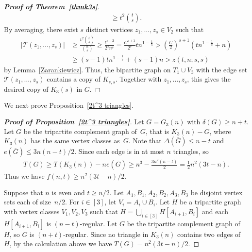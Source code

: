 \documentclass[11pt]{article}
\numberwithin{equation}{section}
\begin{document}
\begin{proof}[\textbf{Proof of Theorem~\ref{thmk3s}}]
\begin{align*}
			\geq t^2\binom{t}{s}.
		\end{align*}
		By averaging, there exist $s$ distinct vertices $z_1,\dots,z_s\in V_2$ such that
		\begin{align*}
			|\mathcal{T}(z_1,\dots,z_s)|&\geq \frac{t^2\binom{t}{s}}{\binom{n}{s}}
			\geq \frac{t^{s+2}}{2^sn^s}
			= \frac{C^{s+1}}{2^s} t n^{1-\frac{1}{s}} > \left(\frac{C}{2} \right)^{s+1} \left( t n^{1-\frac{1}{s}} + n \right)\\
			&\ge (s-1)t n^{1-\frac{1}{s}} + (s-1) n >  z(t, n; s, s)
					\end{align*}
			by Lemma~\ref{Zarankiewicz}.
		Thus, the bipartite graph on $T_1\cup V_3$ with the edge set $\mathcal{T}(z_1,\dots,z_s)$ contains a copy of $K_{s, s}$. Together with $z_1,\dots,z_s$, this gives the desired copy of  $K_3(s)$ in $G$.		
	\end{proof}
	
	
We next prove Proposition~\ref{2t^3 triangles}.	
	
	\begin{proof}[\textbf{Proof of Proposition~\ref{2t^3 triangles}}]
		Let $G = G_3(n)$ with $\delta(G) \ge n+t$. 
		Let $\overline{G}$ be the tripartite complement graph of~$G$, that is $K_3(n) - G$, where $K_3(n)$ has the same vertex classes as~$G$. 
		Note that $\Delta(\overline{G}) \le n-t$ and $e(\overline{G}) \le 3n(n-t)/2$. 
		Since each edge is in at most $n$ triangles, so 
		\begin{align*}
			T(G) \ge T(K_3(n)) - n e(\overline{G}) 
			\geq n^3 - \frac{3n^2(n-t)}2
			= \frac12 n^2 (3t-n).
		\end{align*}
		Thus we have $f(n,t) \ge n^2 (3t-n)/2$.
		
		
		Suppose that $n$ is even and $t \ge n/2$. 
		Let $A_1, B_1, A_2, B_2, A_3,B_3$ be disjoint vertex sets each of size~$n/2$. 
		For $i \in [3]$, let $V_i = A_i \cup B_i$. 
		Let $H$ be a tripartite graph with vertex classes $V_1, V_2, V_3$ such that $H = \bigcup_{i \in [3]} H[A_{i+1},B_{i}]$ and each $H[A_{i+1},B_{i}]$ is $(n-t)$-regular. 
		Let $G$ be the tripartite complement graph of~$H$, so $G$ is $(n+t)$-regular. 
		Since no triangle in $K_3(n)$ contains two edges of~$H$, by the calculation above we have $T(G) = n^2 (3t-n)/2$.
	\end{proof}
	
	
	
	
	
	
	
	
	
\end{document}
